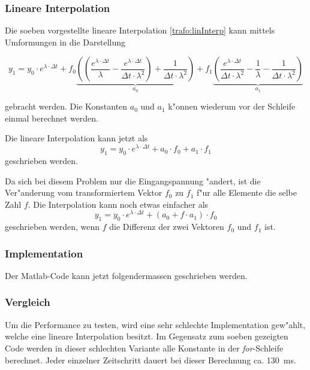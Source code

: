 \begin{refsection}
\subsubsection{Lineare Interpolation}
Die soeben vorgestellte lineare Interpolation \ref{trafo:linInterp} kann mittels Umformungen in die Darstellung 

\begin{equation*}
	y_1 = y_0 \cdot e^{\lambda \cdot \Delta t} + f_0 \underbrace{\left(\left(\frac{e^{\lambda \cdot \Delta t}}{\lambda} - \frac{e^{\lambda \cdot \Delta t}}{\Delta t \cdot \lambda ^2}\right) + \frac{1}{\Delta t \cdot \lambda^2}\right)}_{a_0} + f_1 \underbrace{\left(\frac{e^{\lambda \cdot \Delta t}}{\Delta t \cdot \lambda^2} - \frac{1}{\lambda} - \frac{1}{\Delta t \cdot \lambda^2}\right)}_{a_1}
\end{equation*} 

gebracht werden. Die Konstanten $a_0$ und $a_1$ k"onnen wiederum vor der Schleife einmal berechnet werden. 

Die lineare Interpolation kann jetzt als 
\begin{equation*}
	y_1 = y_0 \cdot e^{\lambda \cdot \Delta t} + a_0 \cdot f_0 + a_1 \cdot f_1
\end{equation*}
geschrieben werden. 

Da sich bei diesem Problem nur die Eingangspannung "andert, ist die Ver"anderung vom transformiertem Vektor $f_0$ zu $f_1$ f"ur alle Elemente die selbe Zahl $f$. Die Interpolation kann noch etwas einfacher als
\begin{equation*}
	y_1 = y_0 \cdot e^{\lambda \cdot \Delta t} + (a_0 + f \cdot  a_1) \cdot f_0
\end{equation*}
geschrieben werden, wenn $f$ die Differenz der zwei Vektoren $f_0$ und $f_1$ ist. 

\subsubsection{Implementation}
Der Matlab-Code kann jetzt folgendermassen geschrieben werden.

{\scriptsize }

\subsubsection{Vergleich}

Um die Performance zu testen, wird eine sehr schlechte Implementation gew"ahlt, welche eine lineare Interpolation besitzt. Im Gegensatz zum soeben gezeigten Code werden in dieser schlechten Variante alle Konstante in der \textit{for}-Schleife berechnet. Jeder einzelner Zeitschritt dauert bei dieser Berechnung ca. \SI{130}{\milli\second}. 


\end{refsection}
